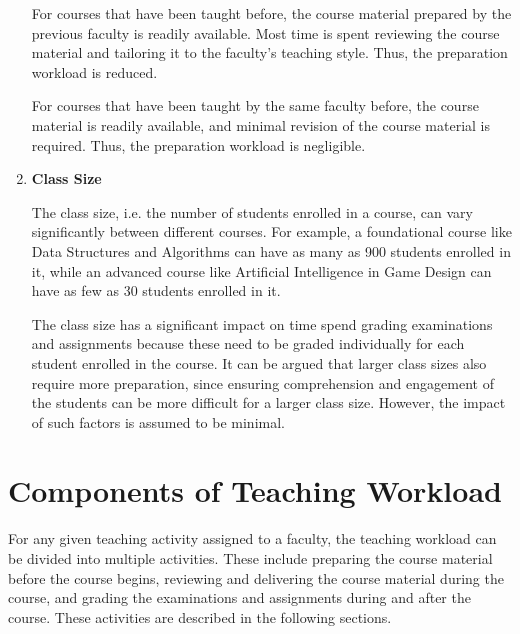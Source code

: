 \begin{enumerate}
        For courses that have been taught before, the course material prepared by the previous faculty is readily available. Most time is spent reviewing the course material and tailoring it to the faculty's teaching style. Thus, the preparation workload is reduced.

        For courses that have been taught by the same faculty before, the course material is readily available, and minimal revision of the course material is required. Thus, the preparation workload is negligible.

  \item \textbf{Class Size}

        The class size, i.e. the number of students enrolled in a course, can vary significantly between different courses. For example, a foundational course like Data Structures and Algorithms can have as many as 900 students enrolled in it, while an advanced course like Artificial Intelligence in Game Design can have as few as 30 students enrolled in it.

        The class size has a significant impact on time spend grading examinations and assignments because these need to be graded individually for each student enrolled in the course. It can be argued that larger class sizes also require more preparation, since ensuring comprehension and engagement of the students can be more difficult for a larger class size. However, the impact of such factors is assumed to be minimal.

\end{enumerate}


\section{Components of Teaching Workload}

For any given teaching activity assigned to a faculty, the teaching workload can be divided into multiple activities. These include preparing the course material before the course begins, reviewing and delivering the course material during the course, and grading the examinations and assignments during and after the course. These activities are described in the following sections.

